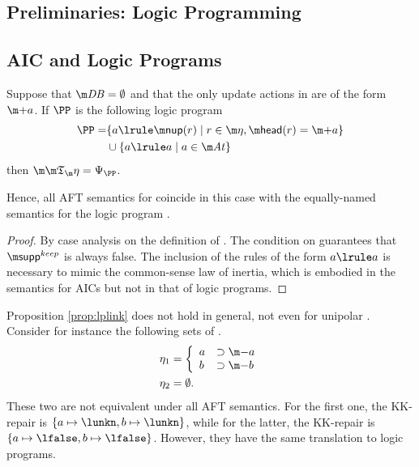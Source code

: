 \subsection{Preliminaries: Logic Programming}


\subsection{AIC and Logic Programs}

\begin{proposition}\label{prop:lplink}
  Suppose that $\db=\emptyset$ and that the only update actions in \aics are of the form $\add a$.
  If $\PP$ is the following logic program
 \begin{align*}
  \PP =& \{a \lrule \nup(r)\mid r\in \aics, \head(r)= \add a\}\\
  &\cup \{a \lrule a\mid a \in \atoms\}
 \end{align*}
 then $\Ap = \Psi_\PP$. 

Hence, all AFT semantics for \fulldb coincide in this case with the equally-named semantics for the logic program \PP. 
\end{proposition}
\begin{proof}
  By case analysis on the definition of \Ap.
  The condition on \fulldb guarantees that $\suppout$ is always false.
  The inclusion of the rules of the form $a\lrule a$ is necessary to mimic the common-sense law of inertia, which is embodied in the semantics for AICs but not in that of logic programs.
\end{proof}

\begin{example}
 Proposition \ref{prop:lplink} does not hold in general, not even for unipolar \aics. 
 Consider for instance the following sets of \aics. 
 \begin{align*}\eta_1 &= \left\{\begin{array}{ll}
                    a &\aicrule \remove a\\
                    b & \aicrule \remove b
                   \end{array}\right.\\
                   \eta_2 &=\emptyset.
\end{align*}
These two are not equivalent under all AFT semantics. 
For the first one, the KK-repair is $\{a\mapsto\lunkn,b\mapsto\lunkn\}$, while for the latter, the KK-repair is $\{a\mapsto\lfalse,b\mapsto\lfalse\}$. However, they have the same translation to logic programs.          
%                    
% 
\end{example}

